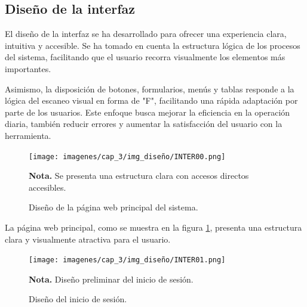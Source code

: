 	\subsection{Diseño de la interfaz}
	
	El diseño de la interfaz se ha desarrollado para ofrecer una experiencia clara, intuitiva y accesible. Se ha tomado en cuenta la estructura lógica de los procesos del sistema, facilitando que el usuario recorra visualmente los elementos más importantes.
	
	Asimismo, la disposición de botones, formularios, menús y tablas responde a la lógica del escaneo visual en forma de "F", facilitando una rápida adaptación por parte de los usuarios. Este enfoque busca mejorar la eficiencia en la operación diaria, también reducir errores y aumentar la satisfacción del usuario con la herramienta.
	
	\vspace{0.3cm} %
	\begin{figure}[!h] %
		\caption[Diseño de la página web principal del sistema]
		{\newline Diseño de la página web principal del sistema.} %
		\centering
		\texttt{[image: imagenes/cap\_3/img\_diseño/INTER00.png]} %
		\begin{flushleft}
			\hspace{1.20cm} \textbf{Nota.} Se presenta una estructura clara con accesos directos accesibles. %
		\end{flushleft}
		\vspace{-24pt}
		\label{fig:inter00} %
	\end{figure}
	
	La página web principal, como se muestra en la figura \ref{fig:inter00}, presenta una estructura clara y visualmente atractiva para el usuario.
	
	\vspace{-1cm} %
	\begin{figure}[!h] %
		\caption[Diseño del inicio de sesión]
		{\newline Diseño del inicio de sesión.} %
		\centering
		\texttt{[image: imagenes/cap\_3/img\_diseño/INTER01.png]} %
		\begin{flushleft}
			\hspace{1.20cm} \textbf{Nota.} Diseño preliminar del inicio de sesión. %
		\end{flushleft}
		\vspace{-16pt}
		\label{fig:inter01} %
	\end{figure}
	\vspace{0.9cm} %
	
